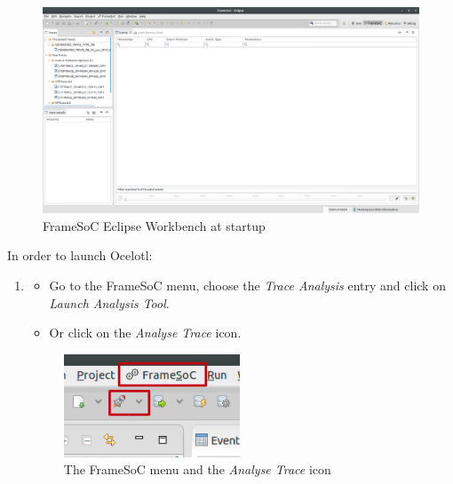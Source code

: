 \documentclass[twoside]{article}
\begin{document}
\begin{sloppypar}
\begin{figure}[h!]
	\centering
    \includegraphics[width=1.0\textwidth]{images/framesoc_launch.png}
	\caption{FrameSoC Eclipse Workbench at startup}
	\label{frameLaunch}
\end{figure}

In order to launch Ocelotl:
\begin{enumerate}
	\item 
	\begin{itemize}
		\item Go to the FrameSoC menu, choose the \textit{Trace Analysis} entry and click on \textit{Launch Analysis Tool}. 
		\item Or click on the \textit{Analyse Trace} icon.
	\end{itemize}

	\begin{figure}[h!]
		\centering
		\includegraphics[scale=0.5]{images/labeled.png}
		\caption{The FrameSoC menu and the \textit{Analyse Trace} icon}
		\label{launchOcelotl}
	\end{figure}
	

\end{enumerate}
\end{sloppypar}
\end{document}
